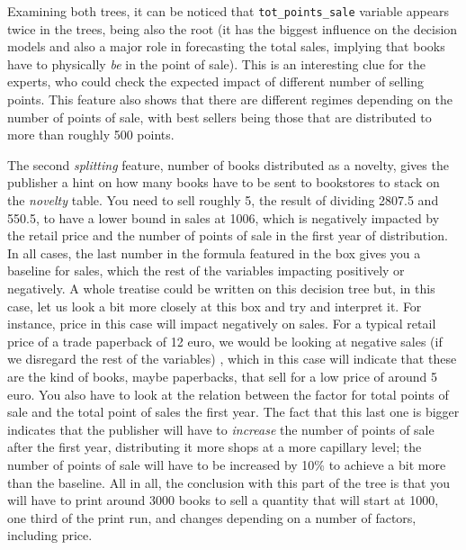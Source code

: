 \documentclass[a4paper,10pt,twocolumn,preprint,3p]{elsarticle}
\begin{document}
Examining both trees, it can be noticed that
\texttt{tot\_points\_sale} variable appears twice in the trees, being also the root
(it has the biggest influence on the decision models and also a major role in forecasting the total sales, implying that books have to physically {\em be} in the point of sale).
This is an interesting clue for the
experts, who could check the expected impact of different number of
selling points. This feature also shows that there are different
regimes depending on the number of points of sale, with best sellers
being those that are distributed to more than roughly 500 points. 

The second {\em splitting} feature, number of books distributed as a
novelty, gives the publisher a hint on how many books have to be sent
to bookstores to stack on the {\em novelty} table. You need to sell
roughly 5, the result of dividing 2807.5 and 550.5, to have a lower
bound in sales at 1006, which is negatively impacted by the retail
price and the number of points of sale in the first year of
distribution. In all cases, the last number in the formula featured in
the box gives you a baseline for sales, which the rest of the
variables impacting positively or negatively. A whole treatise could
be written on this decision tree but, in this case, let us look a bit
more closely at this box and try and interpret it. For instance, price
in this case will impact negatively on sales. For a typical retail
price of a trade paperback of 12 euro, we would be looking at negative
sales (if we disregard the rest of the variables) , which in this case
will indicate that these are the kind of books, maybe paperbacks, that
sell for a low price of around 5 euro. You also have to look at the
relation between the factor for total points of sale and the total
point of sales the first year. The fact that this last one is bigger
indicates that the publisher will have to {\em increase} the number of
points of sale after the first year, distributing it more shops at a
more capillary level; the number of points of sale will have to be
increased by 10\% to achieve a bit more than the baseline. All in all,
the conclusion with this part of the tree is that you will have to
print around 3000 books to sell a quantity that will start at 1000,
one third of the print run, and changes depending on a number of
factors, including price.
\end{document}
